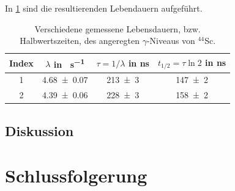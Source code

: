 \documentclass[
	a4paper,
	12pt,
	pagesize,
	ngerman
]{scrartcl}
\begin{document}
		In \cref{tb_leb} sind die resultierenden Lebendauern aufgeführt.
		\begin{table}[H]
		\centering
		\begin{tabular}{c | c | c | c  }
			 Index&$\lambda$ in \si{\mu s^{-1}}& $\tau=1/\lambda$ in \si{ns} &$t_{1/2}=\tau\ln 2$ in \si{ns}\\ \hline
			 1&\SI{4.68+-0.07}{}&\SI{213+-3}{}&\SI{147+-2}{} \\
			 2&\SI{4.39+-0.06}{}&\SI{228+-3}{}&\SI{158+-2}{} \\
		\end{tabular}
		\caption{
		Verschiedene gemessene Lebensdauern, bzw. Halbwertszeiten, des angeregten $\gamma$-Niveaus von $^{44}$Sc.
		}
			 \label{tb_leb}
	\end{table}
	\subsection{Diskussion}

	\section{Schlussfolgerung}

\end{document}
